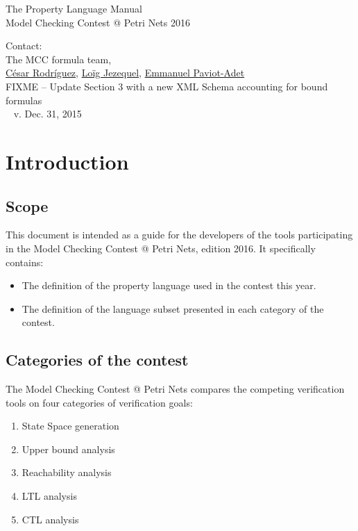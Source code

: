 \documentclass[10pt,english,a4paper]{article}
\makeatletter
\newcommand{\mcc}[0]{MCC}
\newcommand{\mccl}[0]{Model Checking Contest @ Petri Nets}
\newcommand\mysection[1]{\color{sectioncolor}\section{#1}\color{defaultcolor}}
\newcommand\mysubsection[1]{\color{sectioncolor}\subsection{#1}\color{defaultcolor}}
\makeatother
\begin{document}
\color{defaultcolor}

\vspace*{5cm}
\Huge
The Property Language Manual \\[10pt]
\Large
Model Checking Contest @ Petri Nets 2016

\vspace{3cm}
\large
Contact: \\[15pt]
The \mcc{} formula team, \\
\href{mailto:cesar.rodriguez@lipn.fr}{César Rodríguez},
\href{mailto:loig.jezequel@irccyn.ec-nantes.fr}{Loïg Jezequel},
\href{mailto:emmanuel.paviot-adet@lip6.fr}{Emmanuel Paviot-Adet}
\vspace{2cm}
\\
FIXME -- Update Section 3 with a new XML Schema accounting for bound formulas
\\

\vfill
~
\hfill
\scriptsize
v\@. Dec\@. 31, 2015
\normalsize

\clearpage
\tableofcontents

\clearpage
\mysection{Introduction}

\mysubsection{Scope}

This document is intended as a guide for the developers of
the tools participating in the \mccl{}, edition 2016.
It specifically contains:

\begin{itemize}
\item
  The definition of the property language used in the contest this year.
\item
  The definition of the language subset presented in each category of the
  contest.
\end{itemize}

\mysubsection{Categories of the contest}

The \mccl{} compares the competing verification tools on four
categories of verification goals:

\begin{enumerate}
\item State Space generation
\item Upper bound analysis
\item Reachability analysis
\item LTL analysis
\item CTL analysis
\end{enumerate}
\end{document}
